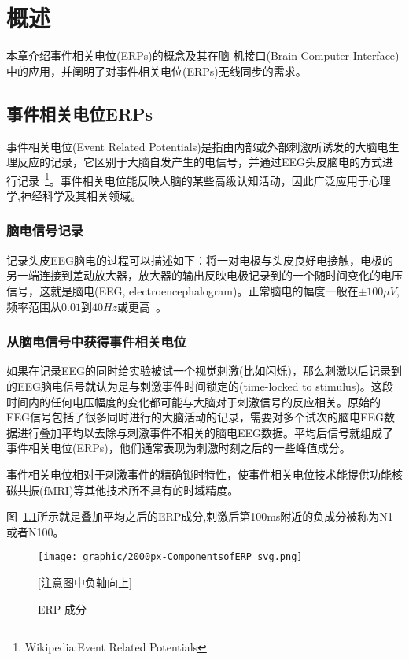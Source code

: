 \chapter{概述}

本章介绍事件相关电位(ERPs)的概念及其在脑-机接口(Brain Computer Interface)中的应用，并阐明了对事件相关电位(ERPs)无线同步的需求。

\section{事件相关电位ERPs}

事件相关电位(Event Related Potentials)是指由内部或外部刺激所诱发的大脑电生理反应的记录，它区别于大脑自发产生的电信号，并通过EEG头皮脑电的方式进行记录~\footnote{Wikipedia:Event Related Potentials}。事件相关电位能反映人脑的某些高级认知活动，因此广泛应用于心理学,神经科学及其相关领域。

\subsection{脑电信号记录}
记录头皮EEG脑电的过程可以描述如下：将一对电极与头皮良好电接触，电极的另一端连接到差动放大器，放大器的输出反映电极记录到的一个随时间变化的电压信号，这就是脑电(EEG, electroencephalogram)。正常脑电的幅度一般在$\pm 100\mu V$,频率范围从$0.01$到$40Hz$或更高~\cite{RuggNovember71996}。

\subsection{从脑电信号中获得事件相关电位}
如果在记录EEG的同时给实验被试一个视觉刺激(比如闪烁)，那么刺激以后记录到的EEG脑电信号就认为是与刺激事件时间锁定的(time-locked to stimulus)。这段时间内的任何电压幅度的变化都可能与大脑对于刺激信号的反应相关。原始的EEG信号包括了很多同时进行的大脑活动的记录，需要对多个试次的脑电EEG数据进行叠加平均以去除与刺激事件不相关的脑电EEG数据。平均后信号就组成了事件相关电位(ERPs)，他们通常表现为刺激时刻之后的一些峰值成分。

事件相关电位相对于刺激事件的精确锁时特性，使事件相关电位技术能提供功能核磁共振(fMRI)等其他技术所不具有的时域精度。

图~\ref{ERPComponents}所示就是叠加平均之后的ERP成分,刺激后第100ms附近的负成分被称为N1或者N100。

\begin{figure}[!hbp]
\begin{center}
\texttt{[image: graphic/2000px-ComponentsofERP\_svg.png]}
\caption{ERP 成分 \label{ERPComponents}}
[注意图中负轴向上]
\end{center}
\end{figure}

